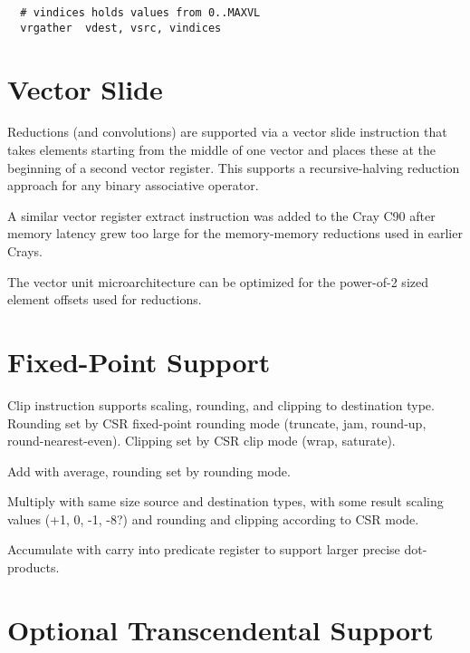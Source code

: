 \begin{verbatim}
  # vindices holds values from 0..MAXVL
  vrgather  vdest, vsrc, vindices
\end{verbatim}

\section{Vector Slide}

Reductions (and convolutions) are supported via a vector slide
instruction that takes elements starting from the middle of one vector
and places these at the beginning of a second vector register.  This
supports a recursive-halving reduction approach for any binary
associative operator.

\begin{commentary}
  A similar vector register extract instruction was added to the Cray
  C90 after memory latency grew too large for the memory-memory
  reductions used in earlier Crays.

  The vector unit microarchitecture can be optimized for the
  power-of-2 sized element offsets used for reductions.
\end{commentary}


\section{Fixed-Point Support}

Clip instruction supports scaling, rounding, and clipping to
destination type.  Rounding set by CSR fixed-point rounding mode
(truncate, jam, round-up, round-nearest-even).  Clipping set by CSR
clip mode (wrap, saturate).

Add with average, rounding set by rounding mode.

Multiply with same size source and destination types, with some result
scaling values (+1, 0, -1, -8?) and rounding and clipping according to
CSR mode.

Accumulate with carry into predicate register to support larger
precise dot-products.

\section{Optional Transcendental Support}

